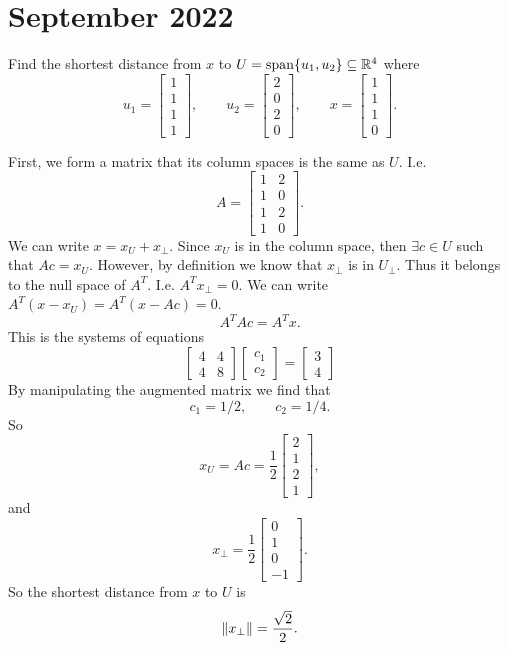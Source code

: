 \section{September 2022}
\begin{problem}
	Find the shortest distance from $ x $ to $ U = \operatorname{span}\{u_1,u_2\} \subseteq \mathbb{R}^4 $ where 
	\[ u_1 = \begin{bmatrix}
		1 \\ 1 \\ 1 \\ 1 
	\end{bmatrix},\qquad
	u_2 = \begin{bmatrix}
		2 \\ 0 \\ 2 \\ 0 
	\end{bmatrix}, \qquad
	x = \begin{bmatrix}
		1 \\ 1 \\ 1 \\ 0
	\end{bmatrix}.
	 \]
\end{problem}
\begin{solution}
	First, we form a matrix that its column spaces is the same as $ U $. I.e.
	\[ A = \begin{bmatrix}
		1 & 2 \\
		1 & 0 \\
		1 & 2 \\
		1 & 0
	\end{bmatrix}. \]
	We can write $ x = x_{U} + x_\perp $. Since $ x_{U} $ is in the column space, then $ \exists c\in U $ such that $ A c = x_{U} $. However, by definition we know that $ x_\perp $ is in $ U_\perp $. Thus it belongs to the null space of $ A^T $. I.e. $ A^T x_\perp = 0 $. We can write $ A^T (x - x_U) = A^T(x- Ac) = 0 $.
	\[ A^T A c= A^T x. \]
	This is the systems of equations
	\[ \begin{bmatrix}
		4 & 4 \\
		4 & 8
	\end{bmatrix}
	\begin{bmatrix}
		c_1 \\ c_2 
	\end{bmatrix}
	= \begin{bmatrix}
		3 \\ 4
	\end{bmatrix} \]
	By manipulating the augmented matrix we find that 
	\[ c_1 = 1/2, \qquad c_2 = 1/4. \]
	So 
	\[ x_U = Ac = \frac{1}{2}\begin{bmatrix}
		2 \\ 1 \\ 2 \\1 
	\end{bmatrix}, \]
	and
	\[ x_\perp = \frac{1}{2}\begin{bmatrix}
		0 \\ 1 \\ 0 \\ -1
	\end{bmatrix}. \]
	So the shortest distance from $ x $ to $ U $ is
	\[ \norm{x_\perp} = \frac{\sqrt{2}}{2}. \]	
\end{solution}

